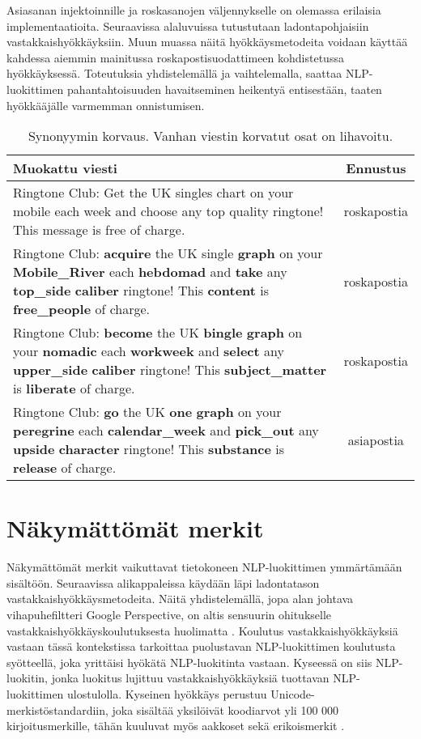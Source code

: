 Asiasanan injektoinnille ja roskasanojen väljennykselle on olemassa erilaisia implementaatioita. Seuraavissa alaluvuissa tutustutaan ladontapohjaisiin vastakkaishyökkäyksiin. Muun muassa näitä hyökkäysmetodeita voidaan käyttää kahdessa aiemmin mainitussa roskapostisuodattimeen kohdistetussa hyökkäyksessä. Toteutuksia yhdistelemällä ja vaihtelemalla, saattaa NLP-luokittimen pahantahtoisuuden havaitseminen heikentyä entisestään, taaten hyökkääjälle varmemman onnistumisen.

\begin{table}[t]
  \caption{Synonyymin korvaus. Vanhan viestin korvatut osat on lihavoitu. \citep{spamfilter}}
  \begin{tabularx}{\textwidth}{| >{\raggedright\arraybackslash}X | c |}
    \hline
    Muokattu viesti & Ennustus\\
    \hline
    Ringtone Club: Get the UK singles chart on your mobile each week and choose any top quality ringtone! This message is free of charge. & roskapostia\\
    \hline
    Ringtone Club: \textbf{acquire} the UK single \textbf{graph} on your \textbf{Mobile\_River} each \textbf{hebdomad} and \textbf{take} any \textbf{top\_side} \textbf{caliber} ringtone! This \textbf{content} is \textbf{free\_people} of charge. & roskapostia\\
    \hline
    Ringtone Club: \textbf{become} the UK \textbf{bingle} \textbf{graph} on your \textbf{nomadic} each \textbf{workweek} and \textbf{select} any \textbf{upper\_side} \textbf{caliber} ringtone! This \textbf{subject\_matter} is \textbf{liberate} of charge. & roskapostia \\
    \hline
    Ringtone Club: \textbf{go} the UK \textbf{one} \textbf{graph} on your \textbf{peregrine} each \textbf{calendar\_week} and \textbf{pick\_out} any \textbf{upside} \textbf{character} ringtone! This \textbf{substance} is \textbf{release} of charge. & asiapostia \\
    \hline
  \end{tabularx}
\end{table}

\section{Näkymättömät merkit}
Näkymättömät merkit vaikuttavat tietokoneen NLP-luokittimen ymmärtämään sisältöön. Seuraavissa alikappaleissa käydään läpi ladontatason vastakkaishyökkäysmetodeita. Näitä yhdistelemällä, jopa alan johtava vihapuhefiltteri Google Perspective, on altis sensuurin ohitukselle vastakkaishyökkäyskoulutuksesta huolimatta \citep{hatespeech}. Koulutus vastakkaishyökkäyksiä vastaan tässä kontekstissa tarkoittaa puolustavan NLP-luokittimen koulutusta syötteellä, joka yrittäisi hyökätä NLP-luokitinta vastaan. Kyseessä on siis NLP-luokitin, jonka luokitus lujittuu vastakkaishyökkäyksiä tuottavan NLP-luokittimen ulostulolla. Kyseinen hyökkäys perustuu Unicode-merkistöstandardiin, joka sisältää yksilöivät koodiarvot yli 100 000 kirjoitusmerkille, tähän kuuluvat myös aakkoset sekä erikoismerkit \citep{boucher2021bad}.

